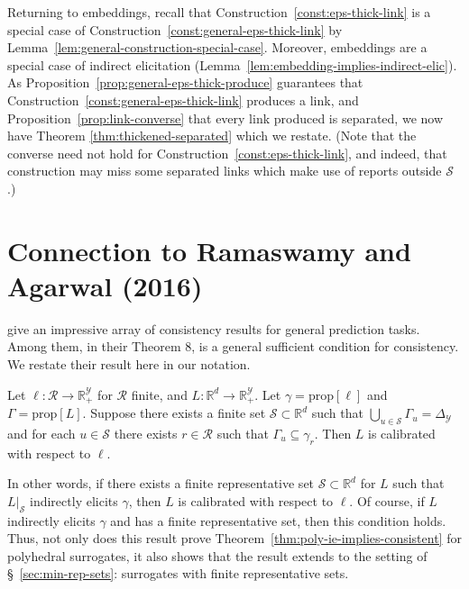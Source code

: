 \documentclass[twoside,11pt]{article}
\newcommand{\reals}{\mathbb{R}}
\newcommand{\prop}[1]{\mathrm{prop}[#1]}
\newcommand{\simplex}{\Delta_\Y}
\newcommand{\R}{\mathcal{R}}
\newcommand{\Sc}{\mathcal{S}}
\newcommand{\Y}{\mathcal{Y}}
\begin{document}
Returning to embeddings, recall that Construction~\ref{const:eps-thick-link} is a special case of Construction~\ref{const:general-eps-thick-link} by Lemma~\ref{lem:general-construction-special-case}.
Moreover, embeddings are a special case of indirect elicitation (Lemma~\ref{lem:embedding-implies-indirect-elic}).
As Proposition~\ref{prop:general-eps-thick-produce} guarantees that Construction~\ref{const:general-eps-thick-link} produces a link, and Proposition~\ref{prop:link-converse} that every link produced is separated, we now have
Theorem \ref{thm:thickened-separated} which we restate.
(Note that the converse need not hold for Construction~\ref{const:eps-thick-link}, and indeed, that construction may miss some separated links which make use of reports outside $\Sc$.)
\thickenedseparated*

\section{Connection to Ramaswamy and Agarwal (2016)}
\label{app:ccdim-construction}

\citet{ramaswamy2016convex} give an impressive array of consistency results for general prediction tasks.
Among them, in their Theorem 8, is a general sufficient condition for consistency.
We restate their result here in our notation.

\begin{theorem}
  Let $\ell : \R \to \reals^\Y_+$ for $\R$ finite, and $L:\reals^d\to\reals^\Y_+$.
  Let $\gamma = \prop{\ell}$ and $\Gamma = \prop{L}$.
  Suppose there exists a finite set $\Sc \subset \reals^d$ such that $\bigcup_{u\in\Sc} \Gamma_u = \simplex$ and for each $u\in\Sc$ there exists $r\in\R$ such that $\Gamma_u\subseteq\gamma_r$.
  Then $L$ is calibrated with respect to $\ell$.
\end{theorem}

In other words, if there exists a finite representative set $\Sc \subset \reals^d$ for $L$ such that $L|_{\Sc}$ indirectly elicits $\gamma$, then $L$ is calibrated with respect to $\ell$.
Of course, if $L$ indirectly elicits $\gamma$ and has a finite representative set, then this condition holds.
Thus, not only does this result prove Theorem~\ref{thm:poly-ie-implies-consistent} for polyhedral surrogates, it also shows that the result extends to the setting of \S~\ref{sec:min-rep-sets}: surrogates with finite representative sets.
\end{document}
